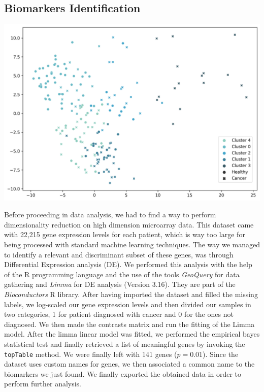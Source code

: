 \documentclass{article}
\newenvironment{Figure}
  {\par\medskip\noindent\minipage{\linewidth}}
  {\endminipage\par\medskip}
\begin{document}
\begin{multicols}{2}
\subsection{Biomarkers Identification}
\label{ssec:biomarkers}
\begin{Figure}
    \centering
    \includegraphics[width=\linewidth]{assets/cluster.png} 
    \label{fig:kmeans}
\end{Figure}
Before proceeding in data analysis, we had to find a way to perform dimensionality reduction on high dimension microarray data. This dataset came with 22,215 gene expression levels for each patient, which is way too large for being processed with standard machine learning techniques. The way we managed to identify a relevant and discriminant subset of these genes, was through Differential Expression analysis (DE). 
\noindent
We performed this analysis with the help of the R programming language and the use of the tools \textit{GeoQuery} for data gathering and \textit{Limma} for DE analysis (Version 3.16). They are part of the \textit{Bioconductors} R library. 
After having imported the dataset and filled the missing labels, we log-scaled our gene expression levels and then divided our samples in two categories, 1 for patient diagnosed with cancer and 0 for the ones not diagnosed. 
We then made the contrasts matrix and run the fitting of the Limma model. After the limma linear model was fitted, we performed the empirical bayes statistical test and finally retrieved a list of meaningful genes by invoking the \texttt{topTable} method.
We were finally left with 141 genes ($p=0.01$). Since the dataset uses custom names for genes, we then associated a common name to the biomarkers we just found. We finally exported the obtained data in order to perform further analysis.


\end{multicols}
\end{document}
